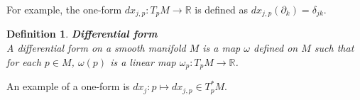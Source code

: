 \documentclass[11pt]{book} %
\newtheorem{definition}{Definition}[section]
\begin{document}
For example, the one-form $dx_{j,p} : T_pM \to \mathbb{R}$ is defined as $dx_{j,p}(\partial_k) = \delta_{jk}$.

\begin{definition}{\textbf{Differential form}} \\
    A differential form on a smooth manifold \( M \) is a map $\omega$ defined on $M$ such that for each $p \in M$,
    $\omega(p)$ is a linear map $\omega_p : T_pM \to \mathbb{R}$.
\end{definition}

An example of a one-form is $dx_j : p \mapsto dx_{j,p} \in T_p^*M$.











\end{document}
